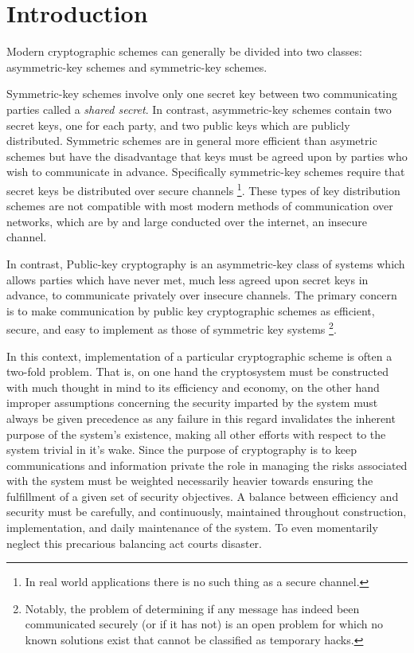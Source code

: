 \section{Introduction}

Modern cryptographic schemes can generally be divided into two classes: asymmetric-key schemes and symmetric-key schemes. 

Symmetric-key schemes involve only one secret key between two communicating parties called a \emph{shared secret}. In contrast, asymmetric-key schemes contain two secret keys, one for each party, and two public keys which are publicly distributed.
Symmetric schemes are in general more efficient than asymetric schemes but have the disadvantage that keys must be agreed upon by parties who wish to communicate in advance. Specifically symmetric-key schemes require that secret keys be distributed over secure channels \footnote{In real world applications there is no such thing as a secure channel.}. These types of key distribution schemes are not compatible with most modern methods of communication over networks, which are by and large conducted over the internet, an insecure channel.


In contrast, Public-key cryptography is an asymmetric-key class of systems which allows parties which have never met, much less agreed upon secret keys in advance, to communicate privately over insecure channels. The primary concern is to make communication by public key cryptographic schemes as efficient, secure, and easy to implement as those of symmetric key systems \footnote{Notably, the problem of determining if any message has indeed been communicated securely (or if it has not) is an open problem for which no known solutions exist that cannot be classified as temporary hacks.}.


In this context, implementation of a particular cryptographic scheme is often a two-fold problem. That is, on one hand the cryptosystem must be constructed with much thought in mind to its efficiency and economy, on the other hand improper assumptions concerning the security imparted by the system must always be given precedence as any failure in this regard invalidates the inherent purpose of the system's existence, making all other efforts with respect to the system trivial in it's wake. Since the purpose of cryptography is to keep communications and information private the role in managing the risks associated with the system must be weighted necessarily heavier towards ensuring the fulfillment of a given set of security objectives. A balance between efficiency and security must be carefully, and continuously, maintained throughout construction, implementation, and daily maintenance of the system. To even momentarily neglect this precarious balancing act courts disaster. 

